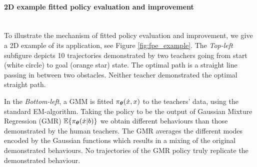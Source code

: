 

\paragraph{2D example fitted policy evaluation and improvement}\\

To illustrate the mechanism of fitted policy evaluation and improvement, we give a 2D example 
of its application, see Figure \ref{fig:fpe_example}. The \textit{Top-left} subfigure
depicts 10 trajectories demonstrated by two teachers going from start (white circle) to goal (orange star) state. 
The optimal path is a straight line passing in between two obstacles. 
Neither teacher demonstrated the optimal straight path. 

In the \textit{Bottom-left}, a GMM is fitted $\pi_{\boldsymbol{\theta}}(\dot{x},x)$ to the teachers' data, using the standard EM-algorithm.
Taking the policy to be the output of Gaussian Mixture Regression (GMR) $\mathbb{E}\{\pi_{\boldsymbol{\theta}}(\dot{x}|b)\}$ we obtain different
behaviours than those demonstrated by the human teachers. The GMR averages the different modes encoded by the Gaussian functions 
which results in a mixing of the original demonstrated behaviours. No trajectories of the GMR policy truly replicate 
the demonstrated behaviour. 

